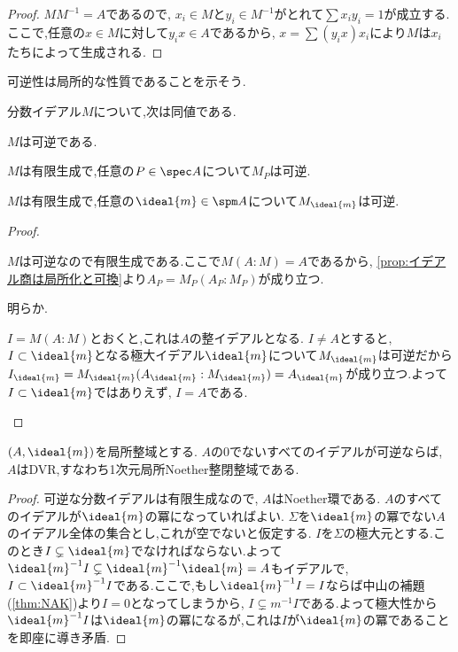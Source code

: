 \begin{proof}
	 $MM^{-1}=A$であるので, $x_i\in M$と$y_i\in M^{-1}$がとれて$\sum x_iy_i=1$が成立する.ここで,任意の$x\in M$に対して$y_ix\in A$であるから, $x=\sum(y_ix)x_i$により$M$は$x_i$たちによって生成される.
\end{proof}

可逆性は局所的な性質であることを示そう.
	
\begin{prop}\label{prop:可逆性は局所的}
	分数イデアル$M$について,次は同値である.
	\begin{sakura}
		\item $M$は可逆である.
		\item $M$は有限生成で,任意の$P\in\spec A$について$M_P$は可逆.
		\item $M$は有限生成で,任意の$\ideal{m}\in\spm A$について$M_{\ideal{m}}$は可逆.
	\end{sakura}
\end{prop}

\begin{proof}
	\begin{eqv}[3]
		\item $M$は可逆なので有限生成である.ここで$M(A:M)=A$であるから, \ref{prop:イデアル商は局所化と可換}より$A_P=M_P(A_P:M_P)$が成り立つ.
		\item 明らか.
		\item $I=M(A:M)$とおくと,これは$A$の整イデアルとなる. $I\neq A$とすると, $I\subset \ideal{m}$となる極大イデアル$\ideal{m}$について$M_{\ideal{m}}$は可逆だから$I_{\ideal{m}}=M_{\ideal{m}}(A_{\ideal{m}}:M_{\ideal{m}})=A_{\ideal{m}}$が成り立つ.よって$I\subset\ideal{m}$ではありえず, $I=A$である.
	\end{eqv}
\end{proof}

\begin{lem}\label{lem:局所の場合の可逆性}
	$(A,\ideal{m})$を局所整域とする. $A$の0でないすべてのイデアルが可逆ならば, $A$はDVR,すなわち1次元局所Noether整閉整域である.
\end{lem}

\begin{proof}
	可逆な分数イデアルは有限生成なので, $A$はNoether環である. $A$のすべてのイデアルが$\ideal{m}$の冪になっていればよい. $\Sigma$を$\ideal{m}$の冪でない$A$のイデアル全体の集合とし,これが空でないと仮定する. $I$を$\Sigma$の極大元とする.このとき$I\subsetneq\ideal{m}$でなければならない.よって$\ideal{m}^{-1}I\subsetneq \ideal{m}^{-1}\ideal{m}=A$もイデアルで, $I\subset \ideal{m}^{-1}I$である.ここで,もし$\ideal{m}^{-1}I=I$ならば中山の補題(\ref{thm:NAK})より$I=0$となってしまうから, $I\subsetneq m^{-1}I$である.よって極大性から$\ideal{m}^{-1}I$は$\ideal{m}$の冪になるが,これは$I$が$\ideal{m}$の冪であることを即座に導き矛盾.
\end{proof}

